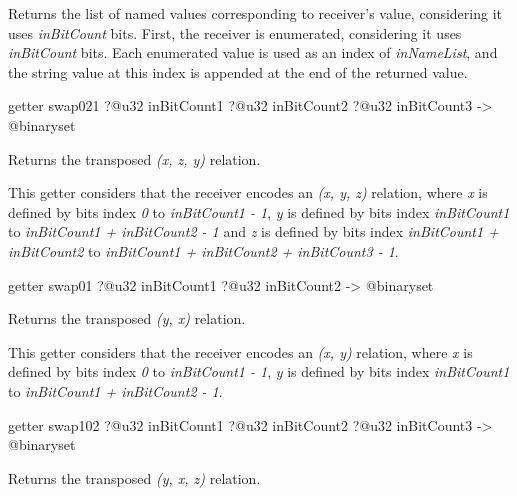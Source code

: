 Returns the list of named values corresponding to receiver's value, considering it uses \emph{inBitCount} bits. First, the receiver is enumerated, considering it uses \emph{inBitCount} bits. Each enumerated value is used as an index of \emph{inNameList}, and the string value at this index is appended at the end of the returned value.








\begin{galgas4box}
getter swap021
  ?@u32 inBitCount1
  ?@u32 inBitCount2
  ?@u32 inBitCount3
  -> @binaryset
\end{galgas4box}



Returns the transposed \emph{(x, z, y)} relation.

This getter considers that the receiver encodes an \emph{(x, y, z)} relation, where \emph{x} is defined by bits index \emph{0} to \emph{inBitCount1  - 1}, \emph{y} is defined by bits index \emph{inBitCount1} to \emph{inBitCount1 + inBitCount2 - 1} and  \emph{z} is defined by bits index \emph{inBitCount1 + inBitCount2} to \emph{inBitCount1 + inBitCount2 + inBitCount3 - 1}.








\begin{galgas4box}
getter swap01 ?@u32 inBitCount1 ?@u32 inBitCount2 -> @binaryset
\end{galgas4box}


Returns the transposed \emph{(y, x)} relation.

This getter considers that the receiver encodes an \emph{(x, y)} relation, where \emph{x} is defined by bits index \emph{0} to \emph{inBitCount1  - 1}, \emph{y} is defined by bits index \emph{inBitCount1} to \emph{inBitCount1 + inBitCount2 - 1}.






\begin{galgas4box}
getter swap102
  ?@u32 inBitCount1
  ?@u32 inBitCount2
  ?@u32 inBitCount3
  -> @binaryset
\end{galgas4box}

Returns the transposed \emph{(y, x, z)} relation.

